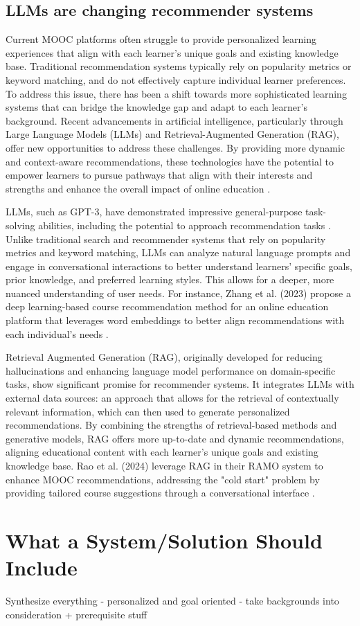 \subsection{LLMs are changing recommender systems}

Current MOOC platforms often struggle to provide personalized learning experiences that align with each learner's unique goals and existing knowledge base. Traditional recommendation systems typically rely on popularity metrics or keyword matching, and do not effectively capture individual learner preferences. To address this issue, there has been a shift towards more sophisticated learning systems that can bridge the knowledge gap and adapt to each learner’s background. Recent advancements in artificial intelligence, particularly through Large Language Models (LLMs) and Retrieval-Augmented Generation (RAG), offer new opportunities to address these challenges. By providing more dynamic and context-aware recommendations, these technologies have the potential to empower learners to pursue pathways that align with their interests and strengths and enhance the overall impact of online education \cite{khalid_recommender_2020}. 

LLMs, such as GPT-3, have demonstrated impressive general-purpose task-solving abilities, including the potential to approach recommendation tasks \cite{noauthor_language_nodate}. Unlike traditional search and recommender systems that rely on popularity metrics and keyword matching, LLMs can analyze natural language prompts and engage in conversational interactions to better understand learners’ specific goals, prior knowledge, and preferred learning styles. This allows for a deeper, more nuanced understanding of user needs. For instance, Zhang et al. (2023) propose a deep learning-based course recommendation method for an online education platform that leverages word embeddings to better align recommendations with each individual’s needs \cite{zhang_personalized_2023}. 

Retrieval Augmented Generation (RAG), originally developed for reducing hallucinations and enhancing language model performance on domain-specific tasks, show significant promise for recommender systems. It integrates LLMs with external data sources: an approach that allows for the retrieval of contextually relevant information, which can then used to generate personalized recommendations. By combining the strengths of retrieval-based methods and generative models, RAG offers more up-to-date and dynamic recommendations, aligning educational content with each learner's unique goals and existing knowledge base. Rao et al. (2024) leverage RAG in their RAMO system to enhance MOOC recommendations, addressing the "cold start" problem by providing tailored course suggestions through a conversational interface \cite{rao_ramo_2024}.
\section{What a System/Solution Should Include}

Synthesize everything 
- personalized and goal oriented
- take backgrounds into consideration + prerequisite stuff 
